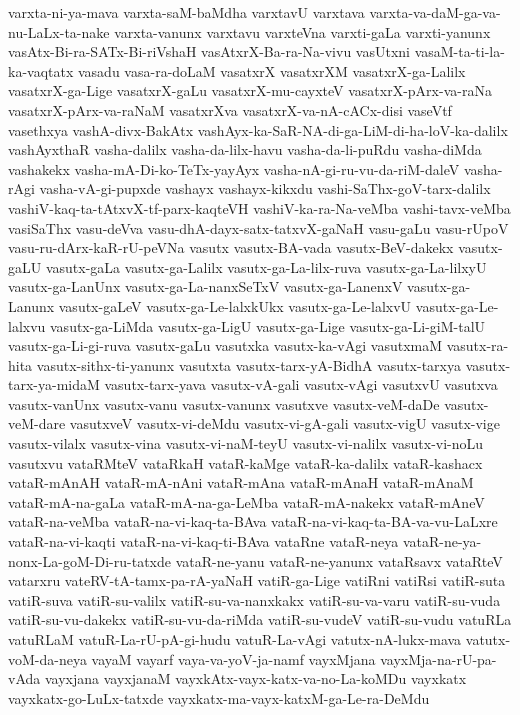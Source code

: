 {varxta-ni-ya-mava
varxta-saM-baMdha
varxtavU
varxtava
varxta-va-daM-ga-va-nu-LaLx-ta-nake
varxta-vanunx
varxtavu
varxteVna
varxti-gaLa
varxti-yanunx
vasAtx-Bi-ra-SATx-Bi-riVshaH
vasAtxrX-Ba-ra-Na-vivu
vasUtxni
vasaM-ta-ti-la-ka-vaqtatx
vasadu
vasa-ra-doLaM
vasatxrX
vasatxrXM
vasatxrX-ga-Lalilx
vasatxrX-ga-Lige
vasatxrX-gaLu
vasatxrX-mu-cayxteV
vasatxrX-pArx-va-raNa
vasatxrX-pArx-va-raNaM
vasatxrXva
vasatxrX-va-nA-cACx-disi
vaseVtf
vasethxya
vashA-divx-BakAtx
vashAyx-ka-SaR-NA-di-ga-LiM-di-ha-loV-ka-dalilx
vashAyxthaR
vasha-dalilx
vasha-da-lilx-havu
vasha-da-li-puRdu
vasha-diMda
vashakekx
vasha-mA-Di-ko-TeTx-yayAyx
vasha-nA-gi-ru-vu-da-riM-daleV
vasha-rAgi
vasha-vA-gi-pupxde
vashayx
vashayx-kikxdu
vashi-SaThx-goV-tarx-dalilx
vashiV-kaq-ta-tAtxvX-tf-parx-kaqteVH
vashiV-ka-ra-Na-veMba
vashi-tavx-veMba
vasiSaThx
vasu-deVva
vasu-dhA-dayx-satx-tatxvX-gaNaH
vasu-gaLu
vasu-rUpoV
vasu-ru-dArx-kaR-rU-peVNa
vasutx
vasutx-BA-vada
vasutx-BeV-dakekx
vasutx-gaLU
vasutx-gaLa
vasutx-ga-Lalilx
vasutx-ga-La-lilx-ruva
vasutx-ga-La-lilxyU
vasutx-ga-LanUnx
vasutx-ga-La-nanxSeTxV
vasutx-ga-LanenxV
vasutx-ga-Lanunx
vasutx-gaLeV
vasutx-ga-Le-lalxkUkx
vasutx-ga-Le-lalxvU
vasutx-ga-Le-lalxvu
vasutx-ga-LiMda
vasutx-ga-LigU
vasutx-ga-Lige
vasutx-ga-Li-giM-talU
vasutx-ga-Li-gi-ruva
vasutx-gaLu
vasutxka
vasutx-ka-vAgi
vasutxmaM
vasutx-ra-hita
vasutx-sithx-ti-yanunx
vasutxta
vasutx-tarx-yA-BidhA
vasutx-tarxya
vasutx-tarx-ya-midaM
vasutx-tarx-yava
vasutx-vA-gali
vasutx-vAgi
vasutxvU
vasutxva
vasutx-vanUnx
vasutx-vanu
vasutx-vanunx
vasutxve
vasutx-veM-daDe
vasutx-veM-dare
vasutxveV
vasutx-vi-deMdu
vasutx-vi-gA-gali
vasutx-vigU
vasutx-vige
vasutx-vilalx
vasutx-vina
vasutx-vi-naM-teyU
vasutx-vi-nalilx
vasutx-vi-noLu
vasutxvu
vataRMteV
vataRkaH
vataR-kaMge
vataR-ka-dalilx
vataR-kashacx
vataR-mAnAH
vataR-mA-nAni
vataR-mAna
vataR-mAnaH
vataR-mAnaM
vataR-mA-na-gaLa
vataR-mA-na-ga-LeMba
vataR-mA-nakekx
vataR-mAneV
vataR-na-veMba
vataR-na-vi-kaq-ta-BAva
vataR-na-vi-kaq-ta-BA-va-vu-LaLxre
vataR-na-vi-kaqti
vataR-na-vi-kaq-ti-BAva
vataRne
vataR-neya
vataR-ne-ya-nonx-La-goM-Di-ru-tatxde
vataR-ne-yanu
vataR-ne-yanunx
vataRsavx
vataRteV
vatarxru
vateRV-tA-tamx-pa-rA-yaNaH
vatiR-ga-Lige
vatiRni
vatiRsi
vatiR-suta
vatiR-suva
vatiR-su-valilx
vatiR-su-va-nanxkakx
vatiR-su-va-varu
vatiR-su-vuda
vatiR-su-vu-dakekx
vatiR-su-vu-da-riMda
vatiR-su-vudeV
vatiR-su-vudu
vatuRLa
vatuRLaM
vatuR-La-rU-pA-gi-hudu
vatuR-La-vAgi
vatutx-nA-lukx-mava
vatutx-voM-da-neya
vayaM
vayarf
vaya-va-yoV-ja-namf
vayxMjana
vayxMja-na-rU-pa-vAda
vayxjana
vayxjanaM
vayxkAtx-vayx-katx-va-no-La-koMDu
vayxkatx
vayxkatx-go-LuLx-tatxde
vayxkatx-ma-vayx-katxM-ga-Le-ra-DeMdu
}
